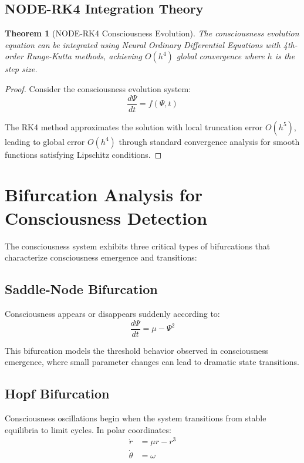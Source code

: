 \documentclass[11pt,a4paper]{article}
\newtheorem{theorem}{Theorem}
\begin{document}
\subsection{NODE-RK4 Integration Theory}

\begin{theorem}[NODE-RK4 Consciousness Evolution]
The consciousness evolution equation can be integrated using Neural Ordinary Differential Equations with 4th-order Runge-Kutta methods, achieving $O(h^4)$ global convergence where $h$ is the step size.
\end{theorem}

\begin{proof}
Consider the consciousness evolution system:
\begin{equation}
\frac{d\Psi}{dt} = f(\Psi, t)
\end{equation}

The RK4 method approximates the solution with local truncation error $O(h^5)$, leading to global error $O(h^4)$ through standard convergence analysis for smooth functions satisfying Lipschitz conditions.
\end{proof}

\section{Bifurcation Analysis for Consciousness Detection}

The consciousness system exhibits three critical types of bifurcations that characterize consciousness emergence and transitions:

\subsection{Saddle-Node Bifurcation}
Consciousness appears or disappears suddenly according to:
\begin{equation}
\frac{d\Psi}{dt} = \mu - \Psi^2
\end{equation}

This bifurcation models the threshold behavior observed in consciousness emergence, where small parameter changes can lead to dramatic state transitions.

\subsection{Hopf Bifurcation}
Consciousness oscillations begin when the system transitions from stable equilibria to limit cycles. In polar coordinates:
\begin{align}
\dot{r} &= \mu r - r^3\\
\dot{\theta} &= \omega
\end{align}
\end{document}
